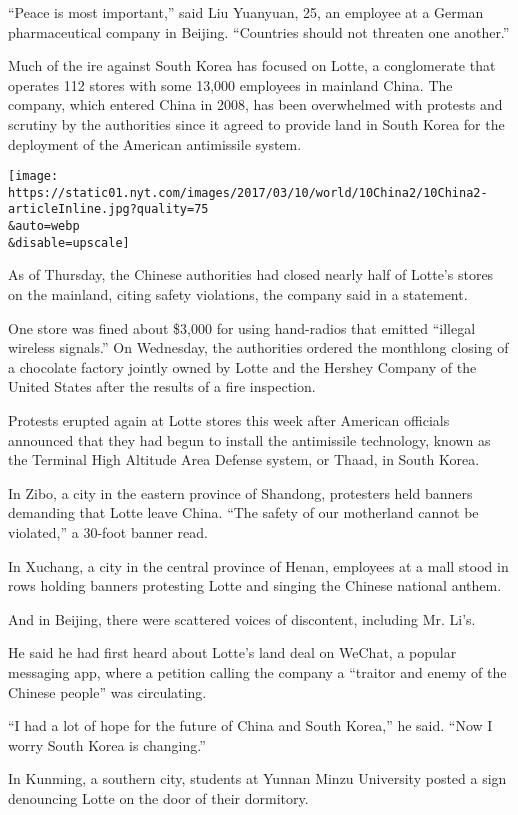 ``Peace is most important,'' said Liu Yuanyuan, 25, an employee at a
German pharmaceutical company in Beijing. ``Countries should not
threaten one another.''

Much of the ire against South Korea has focused on Lotte, a conglomerate
that operates 112 stores with some 13,000 employees in mainland China.
The company, which entered China in 2008, has been overwhelmed with
protests and scrutiny by the authorities since it agreed to provide land
in South Korea for the deployment of the American antimissile system.

\texttt{[image: https://static01.nyt.com/images/2017/03/10/world/10China2/10China2-articleInline.jpg?quality=75\\\&auto=webp\\\&disable=upscale]}

As of Thursday, the Chinese authorities had closed nearly half of
Lotte's stores on the mainland, citing safety violations, the company
said in a statement.

One store was fined about \$3,000 for using hand-radios that emitted
``illegal wireless signals.'' On Wednesday, the authorities ordered the
monthlong closing of a chocolate factory jointly owned by Lotte and the
Hershey Company of the United States after the results of a fire
inspection.

Protests erupted again at Lotte stores this week after American
officials announced that they had begun to install the antimissile
technology, known as the Terminal High Altitude Area Defense system, or
Thaad, in South Korea.

In Zibo, a city in the eastern province of Shandong, protesters held
banners demanding that Lotte leave China. ``The safety of our motherland
cannot be violated,'' a 30-foot banner read.

In Xuchang, a city in the central province of Henan, employees at a mall
stood in rows holding banners protesting Lotte and singing the Chinese
national anthem.

And in Beijing, there were scattered voices of discontent, including Mr.
Li's.

He said he had first heard about Lotte's land deal on WeChat, a popular
messaging app, where a petition calling the company a ``traitor and
enemy of the Chinese people'' was circulating.

``I had a lot of hope for the future of China and South Korea,'' he
said. ``Now I worry South Korea is changing.''

In Kunming, a southern city, students at Yunnan Minzu University posted
a sign denouncing Lotte on the door of their dormitory.

